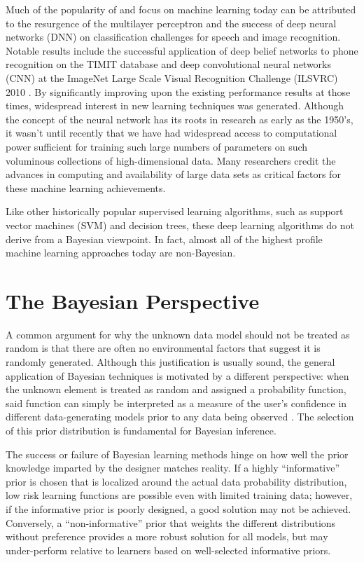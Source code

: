 \documentclass[12pt]{report}
\begin{document}
Much of the popularity of and focus on machine learning today can be attributed to the resurgence of the multilayer perceptron and the success of deep neural networks (DNN) on classification challenges for speech and image recognition. Notable results include the successful application of deep belief networks to phone recognition on the TIMIT database \cite{mohamed} and deep convolutional neural networks (CNN) at the ImageNet Large Scale Visual Recognition Challenge (ILSVRC) 2010 \cite{krizhevsky}. By significantly improving upon the existing performance results at those times, widespread interest in new learning techniques was generated. Although the concept of the neural network has its roots in research as early as the 1950's, it wasn't until recently that we have had widespread access to computational power sufficient for training such large numbers of parameters on such voluminous collections of high-dimensional data. Many researchers credit the advances in computing and availability of large data sets as critical factors for these machine learning achievements.


Like other historically popular supervised learning algorithms, such as support vector machines (SVM) and decision trees, these deep learning algorithms do not derive from a Bayesian viewpoint. In fact, almost all of the highest profile machine learning approaches today are non-Bayesian. 


\section{The Bayesian Perspective}

A common argument for why the unknown data model should not be treated as random is that there are often no environmental factors that suggest it is randomly generated. Although this justification is usually sound, the general application of Bayesian techniques is motivated by a different perspective: when the unknown element is treated as random and assigned a probability function, said function can simply be interpreted as a measure of the user's confidence in different data-generating models prior to any data being observed \cite{box}. The selection of this prior distribution is fundamental for Bayesian inference.

The success or failure of Bayesian learning methods hinge on how well the prior knowledge imparted by the designer matches reality. If a highly ``informative'' prior \cite{box} is chosen that is localized around the actual data probability distribution, low risk learning functions are possible even with limited training data; however, if the informative prior is poorly designed, a good solution may not be achieved. Conversely, a ``non-informative'' prior that weights the different distributions without preference provides a more robust solution for all models, but may under-perform relative to learners based on well-selected informative priors.
\end{document}
